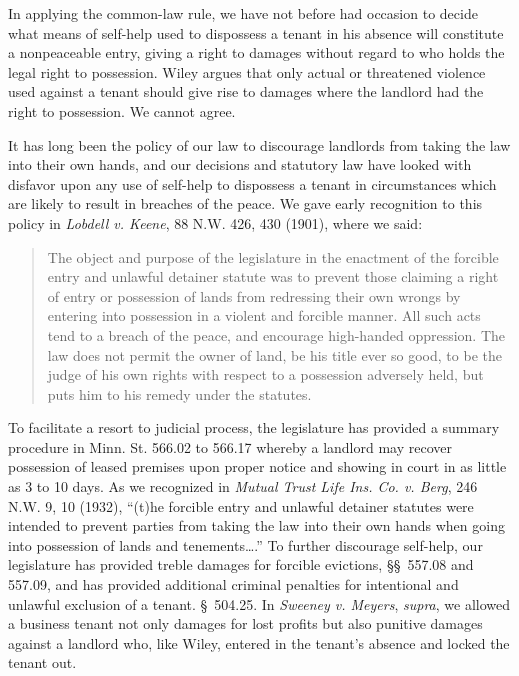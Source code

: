 In applying the common-law rule, we have not before had occasion to decide what
means of self-help used to dispossess a tenant in his absence will constitute a
nonpeaceable entry, giving a right to damages without regard to who holds the
legal right to possession. Wiley argues that only
actual or threatened violence used against a tenant should give rise to damages
where the landlord had the right to possession. We cannot agree.

It has long been the policy of our law to discourage landlords from taking the
law into their own hands, and our decisions and statutory law have looked with
disfavor upon any use of self-help to dispossess a tenant in circumstances
which are likely to result in breaches of the peace. We gave early recognition
to this policy in \textit{Lobdell v. Keene}, 88 N.W. 426, 430 (1901), where we
said:
\begin{quote}
The object and purpose of the legislature in the enactment of the forcible
entry and unlawful detainer statute was to prevent those claiming a right of
entry or possession of lands from redressing their own wrongs by entering into
possession in a violent and forcible manner. All such acts tend to a breach of
the peace, and encourage high-handed oppression. The law does not permit the
owner of land, be his title ever so good, to be the judge of his own rights
with respect to a possession adversely held, but puts him to his remedy under
the statutes.
\end{quote}

To facilitate a resort to judicial process, the legislature has provided a
summary procedure in Minn. St. 566.02 to 566.17 whereby a landlord may recover
possession of leased premises upon proper notice and showing in court in as
little as 3 to 10 days. As we recognized in \textit{Mutual Trust Life Ins. Co.
v. Berg}, 246 N.W. 9, 10 (1932), ``(t)he forcible entry and unlawful detainer
statutes were intended to prevent parties from taking the law into their own
hands when going into possession of lands and tenements\ldots.'' To further
discourage self-help, our legislature has provided treble damages for forcible
evictions, \S\S~557.08 and 557.09, and has provided additional criminal
penalties
for intentional and unlawful exclusion of a tenant. \S~504.25.
In \textit{Sweeney v. Meyers}, \textit{supra}, we allowed a business tenant not
only damages for lost profits but also punitive damages against a landlord who,
like Wiley, entered in the tenant's absence and locked the tenant out.


